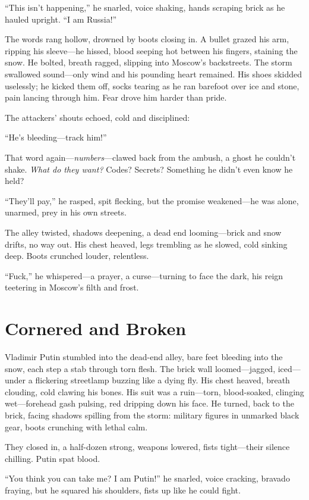 \documentclass[12pt]{book}
\begin{document}
\enquote{This isn’t happening,} he snarled, voice shaking, hands scraping brick as he hauled upright. \enquote{I am Russia!}

The words rang hollow, drowned by boots closing in. A bullet grazed his arm, ripping his sleeve---he hissed, blood seeping hot between his fingers, staining the snow. He bolted, breath ragged, slipping into Moscow’s backstreets. The storm swallowed sound---only wind and his pounding heart remained. His shoes skidded uselessly; he kicked them off, socks tearing as he ran barefoot over ice and stone, pain lancing through him. Fear drove him harder than pride.

The attackers’ shouts echoed, cold and disciplined:

\enquote{He’s bleeding---track him!}

That word again---\textit{numbers}---clawed back from the ambush, a ghost he couldn’t shake. \textit{What do they want?} Codes? Secrets? Something he didn’t even know he held?

\enquote{They’ll pay,} he rasped, spit flecking, but the promise weakened---he was alone, unarmed, prey in his own streets.

The alley twisted, shadows deepening, a dead end looming---brick and snow drifts, no way out. His chest heaved, legs trembling as he slowed, cold sinking deep. Boots crunched louder, relentless.

\enquote{Fuck,} he whispered---a prayer, a curse---turning to face the dark, his reign teetering in Moscow’s filth and frost.

\section{Cornered and Broken}

Vladimir Putin stumbled into the dead-end alley, bare feet bleeding into the snow, each step a stab through torn flesh. The brick wall loomed---jagged, iced---under a flickering streetlamp buzzing like a dying fly. His chest heaved, breath clouding, cold clawing his bones. His suit was a ruin---torn, blood-soaked, clinging wet---forehead gash pulsing, red dripping down his face. He turned, back to the brick, facing shadows spilling from the storm: military figures in unmarked black gear, boots crunching with lethal calm.

They closed in, a half-dozen strong, weapons lowered, fists tight---their silence chilling. Putin spat blood.

\enquote{You think you can take me? I am Putin!} he snarled, voice cracking, bravado fraying, but he squared his shoulders, fists up like he could fight.
\end{document}
